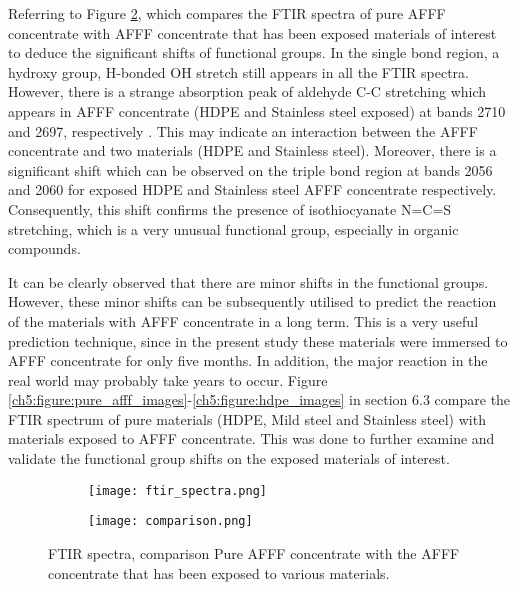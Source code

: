 Referring to Figure \ref{ch5:figure:spectra:b}, which compares the FTIR spectra of pure AFFF concentrate with AFFF concentrate that has been exposed materials of interest to deduce the significant shifts of functional groups. In the single bond region, a hydroxy group, H-bonded OH stretch still appears in all the FTIR spectra. However, there is a strange absorption peak of aldehyde C-C stretching which appears in AFFF concentrate (HDPE and Stainless steel exposed) at bands 2710  and 2697, respectively \cite{lin1991handbook}. This may indicate an interaction between the AFFF concentrate and two materials (HDPE and Stainless steel). Moreover, there is a significant shift which can be observed on the triple bond region at bands 2056 and 2060 for exposed HDPE and Stainless steel AFFF concentrate respectively. Consequently, this shift confirms the presence of isothiocyanate N=C=S stretching, which is a very unusual functional group, especially in organic compounds.

It can be clearly observed that there are minor shifts in the functional groups. However, these minor shifts can be subsequently utilised to predict the reaction of the materials with AFFF concentrate in a long term. This is a very useful prediction technique, since in the present study these materials were immersed to AFFF concentrate for only five months. In addition, the major reaction in the real world may probably take years to occur. Figure \ref{ch5:figure:pure_afff_images}-\ref{ch5:figure:hdpe_images} in section 6.3 compare the FTIR spectrum of pure materials (HDPE, Mild steel and Stainless steel) with materials exposed to AFFF concentrate. This was done to further examine and validate the functional group shifts on the exposed materials of interest.  

\begin{figure}[H]
\centering

\begin{subfigure}{.45\textwidth}
    \texttt{[image: ftir\_spectra.png]}
    \caption{}
    \label{ch5:figure:spectra:a}
\end{subfigure}
\begin{subfigure}{.45\textwidth}
    \texttt{[image: comparison.png]}
    \caption{}
    \label{ch5:figure:spectra:b}
\end{subfigure}

\caption{FTIR spectra, comparison Pure AFFF concentrate with the AFFF concentrate that has been exposed to various materials.}
\label{ch5:figure:spectra}
\end{figure}


